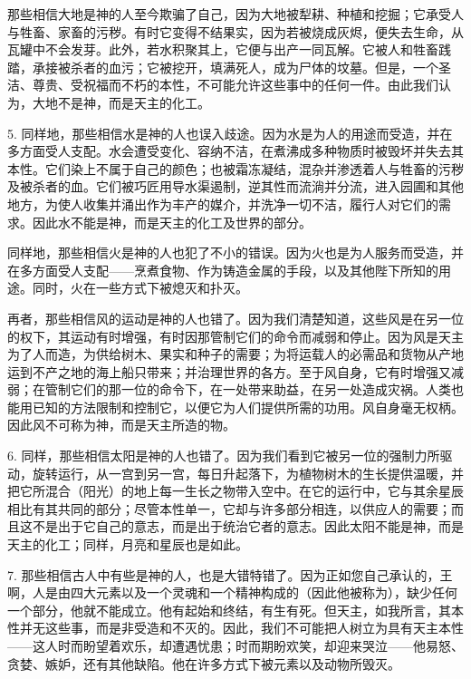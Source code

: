 那些相信大地是神的人至今欺骗了自己，因为大地被犁耕、种植和挖掘；它承受人与牲畜、家畜的污秽。有时它变得不结果实，因为若被烧成灰烬，便失去生命，从瓦罐中不会发芽。此外，若水积聚其上，它便与出产一同瓦解。它被人和牲畜践踏，承接被杀者的血污；它被挖开，填满死人，成为尸体的坟墓。但是，一个圣洁、尊贵、受祝福而不朽的本性，不可能允许这些事中的任何一件。由此我们认为，大地不是神，而是天主的化工。\par

5. 同样地，那些相信水是神的人也误入歧途。因为水是为人的用途而受造，并在多方面受人支配。水会遭受变化、容纳不洁，在煮沸成多种物质时被毁坏并失去其本性。它们染上不属于自己的颜色；也被霜冻凝结，混杂并渗透着人与牲畜的污秽及被杀者的血。它们被巧匠用导水渠遏制，逆其性而流淌并分流，进入园圃和其他地方，为使人收集并涌出作为丰产的媒介，并洗净一切不洁，履行人对它们的需求。因此水不能是神，而是天主的化工及世界的部分。\par

同样地，那些相信火是神的人也犯了不小的错误。因为火也是为人服务而受造，并在多方面受人支配——烹煮食物、作为铸造金属的手段，以及其他陛下所知的用途。同时，火在一些方式下被熄灭和扑灭。\par

再者，那些相信风的运动是神的人也错了。因为我们清楚知道，这些风是在另一位的权下，其运动有时增强，有时因那管制它们的命令而减弱和停止。因为风是天主为了人而造，为供给树木、果实和种子的需要；为将运载人的必需品和货物从产地运到不产之地的海上船只带来；并治理世界的各方。至于风自身，它有时增强又减弱；在管制它们的那一位的命令下，在一处带来助益，在另一处造成灾祸。人类也能用已知的方法限制和控制它，以便它为人们提供所需的功用。风自身毫无权柄。因此风不可称为神，而是天主所造的物。\par

6. 同样，那些相信太阳是神的人也错了。因为我们看到它被另一位的强制力所驱动，旋转运行，从一宫到另一宫，每日升起落下，为植物树木的生长提供温暖，并把它所混合（阳光）的地上每一生长之物带入空中。在它的运行中，它与其余星辰相比有其共同的部分；尽管本性单一，它却与许多部分相连，以供应人的需要；而且这不是出于它自己的意志，而是出于统治它者的意志。因此太阳不能是神，而是天主的化工；同样，月亮和星辰也是如此。\par

7. 那些相信古人中有些是神的人，也是大错特错了。因为正如您自己承认的，王啊，人是由四大元素以及一个灵魂和一个精神构成的（因此他被称为），缺少任何一个部分，他就不能成立。他有起始和终结，有生有死。但天主，如我所言，其本性并无这些事，而是非受造和不灭的。因此，我们不可能把人树立为具有天主本性——这人时而盼望着欢乐，却遭遇忧患；时而期盼欢笑，却迎来哭泣——他易怒、贪婪、嫉妒，还有其他缺陷。他在许多方式下被元素以及动物所毁灭。\par

